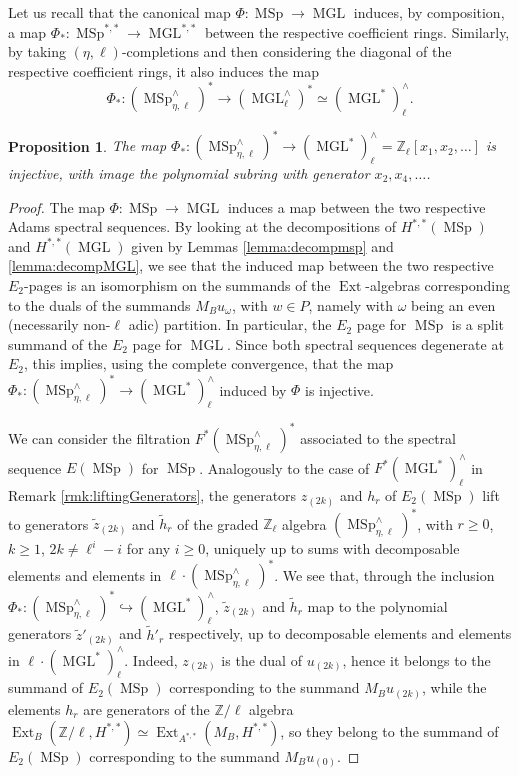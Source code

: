 \documentclass[10pt]{amsart}
\theoremstyle{definition}
\theoremstyle{plain}
\newtheorem{prop}[defn]{Proposition}
\numberwithin{equation}{section}
\newcommand{\0}{\emptyset}
\newcommand{\Z}{{\mathbb Z}}
\newcommand{\MGL}{{\operatorname{MGL}}}
\newcommand{\MSp}{{\operatorname{MSp}}}
\newcommand{\Ext}{{\operatorname{Ext}}}
\begin{document}
Let us recall that the canonical map $\Phi:\MSp \to \MGL$ induces, by composition, a map $\Phi_*:\MSp^{*,*}\to \MGL^{*,*}$ between the respective coefficient rings. Similarly, by taking $(\eta,\ell)$-completions and then considering the diagonal of the respective coefficient rings, it also induces the map
$$\Phi_*:(\MSp_{\eta,\ell}^\wedge)^* \to (\MGL_\ell^\wedge)^*\simeq (\MGL^*)_\ell^\wedge.$$

\begin{prop}\label{prop:PolynomialMSp}The map $\Phi_*:(\MSp_{\eta, \ell}^\wedge)^* \to (\MGL^*)_\ell^\wedge=\Z_\ell[x_1, x_2,\ldots]$ is injective, with image the polynomial subring with generator $x_2, x_4,\ldots$.
\end{prop}

\begin{proof} The map $\Phi: \MSp \to \MGL$ induces a map between the two respective Adams spectral sequences. By looking at the decompositions of $H^{*,*}(\MSp)$ and $H^{*,*}(\MGL)$ given by Lemmas \ref{lemma:decompmsp} and \ref{lemma:decompMGL}, we see that the induced map between the two respective $E_2$-pages is an isomorphism on the summands of the $\Ext$-algebras corresponding to the duals of the summands $M_B u_\omega$, with $w\in P$, namely with $\omega$ being an even (necessarily non-$\ell$ adic) partition. In particular, the $E_2$ page for $\MSp$ is a split summand of the $E_2$ page for $\MGL$. Since both spectral sequences degenerate at $E_2$, this implies, using the complete convergence, that the map 
$\Phi_*:(\MSp_{\eta, \ell}^\wedge)^* \to (\MGL^*)_\ell^\wedge$ induced by $\Phi$ is injective.

We can consider the filtration $F^*(\MSp_{\eta,\ell}^\wedge)^*$ associated to the spectral sequence $E(\MSp)$ for $\MSp$. Analogously to the case of $F^*(\MGL^*)_\ell^\wedge$ in Remark \ref{rmk:liftingGenerators}, the generators $z_{(2k)}$ and $h_r$ of $E_2(\MSp)$ lift to generators $\tilde{z}_{(2k)}$ and $\tilde{h}_r$ of the graded $\Z_\ell$ algebra $(\MSp_{\eta,\ell}^\wedge)^*$, with $r\ge 0$, $k\ge 1$, $2k \neq \ell^i-i$ for any $i \ge 0$,  uniquely up to sums with decomposable elements and elements in $\ell \cdot (\MSp_{\eta,\ell}^\wedge)^*$. We see that, through the inclusion $\Phi_*:(\MSp_{\eta, \ell}^\wedge)^* \hookrightarrow (\MGL^*)_\ell^\wedge$, $\tilde{z}_{(2k)}$ and $\tilde{h}_r$ map to the polynomial generators $\tilde{z}'_{(2k)}$ and $\tilde{h}'_r$ respectively, up to decomposable elements and elements in $\ell \cdot (\MGL^*)^\wedge_\ell$. Indeed, $z_{(2k)}$ is the dual of $u_{(2k)}$,  hence it belongs to the summand of $E_2(\MSp)$ corresponding to the summand $M_B u_{(2k)}$, while the elements $h_r$ are generators of the $\Z/\ell$ algebra $\Ext_B(\Z/\ell,H^{*,*})\simeq \Ext_{A^{*,*}}(M_B,H^{*,*})$, so they belong to the summand of $E_2(\MSp)$ corresponding to the summand $M_B u_{(0)}$. 


\end{proof}
\end{document}
